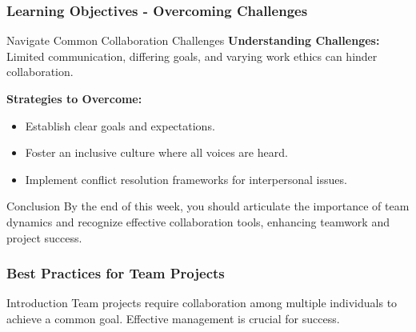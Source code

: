 \documentclass[aspectratio=169]{beamer}
\begin{document}
\begin{frame}[fragile]
    \frametitle{Learning Objectives - Overcoming Challenges}
    \begin{block}{Navigate Common Collaboration Challenges}
        \textbf{Understanding Challenges:} Limited communication, differing goals, and varying work ethics can hinder collaboration.
        
        \textbf{Strategies to Overcome:}
    \end{block}
    
    \begin{itemize}
        \item Establish clear goals and expectations.
        \item Foster an inclusive culture where all voices are heard.
        \item Implement conflict resolution frameworks for interpersonal issues.
    \end{itemize}

    \begin{block}{Conclusion}
        By the end of this week, you should articulate the importance of team dynamics and recognize effective collaboration tools, enhancing teamwork and project success.
    \end{block}
\end{frame}

\begin{frame}[fragile]
    \frametitle{Best Practices for Team Projects}
    \begin{block}{Introduction}
        Team projects require collaboration among multiple individuals to achieve a common goal. Effective management is crucial for success.
    \end{block}
\end{frame}
\end{document}
